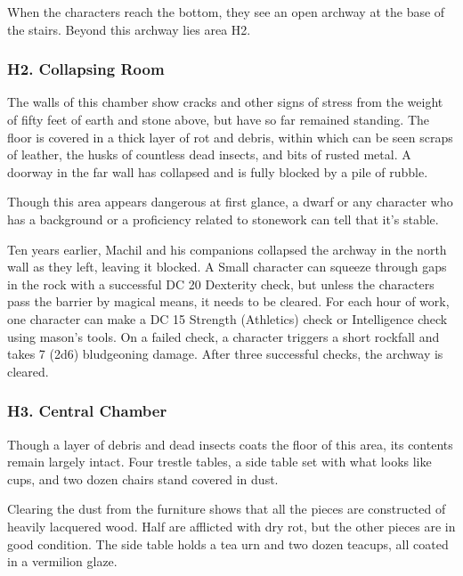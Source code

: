 \documentclass[10pt,a4paper,twoside,bg=print,twocolumn,openany,nodeprecatedcode]{dndbook}
\begin{document}
When the characters reach the bottom, they see an open archway at the base of the stairs. Beyond this archway lies area H2.

\subsubsection{H2. Collapsing Room}
\begin{DndReadAloud}{}
The walls of this chamber show cracks and other signs of stress from the weight of fifty feet of earth and stone above, but have so far remained standing. The floor is covered in a thick layer of rot and debris, within which can be seen scraps of leather, the husks of countless dead insects, and bits of rusted metal. A doorway in the far wall has collapsed and is fully blocked by a pile of rubble.

\end{DndReadAloud}

Though this area appears dangerous at first glance, a dwarf or any character who has a background or a proficiency related to stonework can tell that it's stable.

Ten years earlier, Machil and his companions collapsed the archway in the north wall as they left, leaving it blocked. A Small character can squeeze through gaps in the rock with a successful DC 20 Dexterity check, but unless the characters pass the barrier by magical means, it needs to be cleared. For each hour of work, one character can make a DC 15 Strength (Athletics) check or Intelligence check using mason's tools. On a failed check, a character triggers a short rockfall and takes 7 (2d6) bludgeoning damage. After three successful checks, the archway is cleared.

\subsubsection{H3. Central Chamber}
\begin{DndReadAloud}{}
Though a layer of debris and dead insects coats the floor of this area, its contents remain largely intact. Four trestle tables, a side table set with what looks like cups, and two dozen chairs stand covered in dust.

\end{DndReadAloud}

Clearing the dust from the furniture shows that all the pieces are constructed of heavily lacquered wood. Half are afflicted with dry rot, but the other pieces are in good condition. The side table holds a tea urn and two dozen teacups, all coated in a vermilion glaze.
\end{document}
